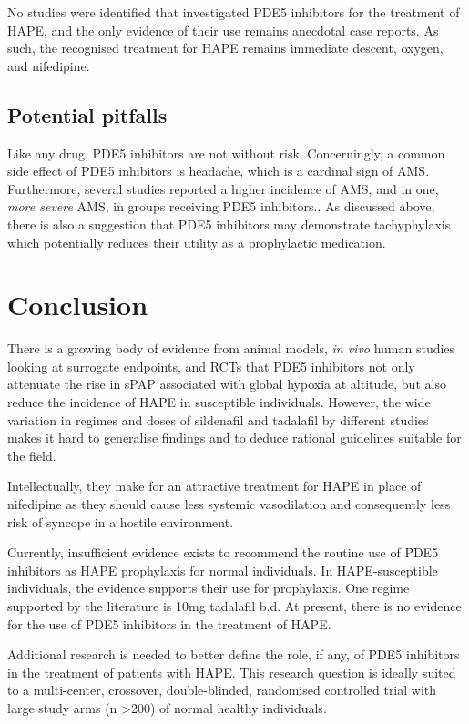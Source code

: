 \documentclass[12pt,a4paper]{article}
\begin{document}
No studies were identified that investigated PDE5 inhibitors for the treatment of HAPE, and the only evidence of their use remains anecdotal case reports. As such, the recognised treatment for HAPE remains immediate descent, oxygen, and nifedipine.

\subsection*{Potential pitfalls}

Like any drug, PDE5 inhibitors are not without risk. Concerningly, a common side effect of PDE5 inhibitors is headache, which is a cardinal sign of AMS. Furthermore, several studies reported a higher incidence of AMS, and in one, \emph{more severe} AMS, in groups receiving PDE5 inhibitors.\cite{Maggiorini:2006kz,Bates:2011du,Leshem:2012jq}. As discussed above, there is also a suggestion that PDE5 inhibitors may demonstrate tachyphylaxis which potentially reduces their utility as a prophylactic medication.\cite{Bates:2011du}

\section*{Conclusion}

There is a growing body of evidence from animal models, \emph{in vivo} human studies looking at surrogate endpoints, and RCTs that PDE5 inhibitors not only attenuate the rise in sPAP associated with global hypoxia at altitude, but also reduce the incidence of HAPE in susceptible individuals. However, the wide variation in regimes and doses of sildenafil and tadalafil by different studies makes it hard to generalise findings and to deduce rational guidelines suitable for the field.

Intellectually, they make for an attractive treatment for HAPE in place of nifedipine as they should cause less systemic vasodilation and consequently less risk of syncope in a hostile environment.\cite{JointFormularyCommittee:2013tz}

Currently, insufficient evidence exists to recommend the routine use of PDE5 inhibitors as HAPE prophylaxis for normal individuals. In HAPE-susceptible individuals, the evidence supports their use for prophylaxis. One regime supported by the literature is 10mg tadalafil b.d. At present, there is no evidence for the use of PDE5 inhibitors in the treatment of HAPE.

 Additional research is needed to better define the role, if any, of PDE5 inhibitors in the treatment of patients with HAPE. This research question is ideally suited to a multi-center, crossover, double-blinded, randomised controlled trial with large study arms (n >200) of normal healthy individuals.

\pagebreak



\end{document}

